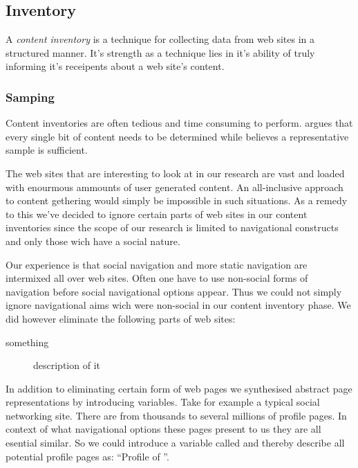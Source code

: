 \subsection{Inventory}

A \emph{content inventory} is a technique for collecting data from web sites
in a structured manner. It's strength as a technique lies in it's ability of
truly informing it's receipents about a web site's content.

\subsubsection{Samping}

Content inventories are often tedious and time consuming to perform.
\citet[p.~267]{wodtke02} argues that every single bit of content needs to be
determined while \citet[p.~241]{morville06} believes a representative sample
is sufficient.

The web sites that are interesting to look at in our research are vast and
loaded with enourmous ammounts of user generated content. An all-inclusive
approach to content gethering would simply be impossible in such situations.
As a remedy to this we've decided to ignore certain parts of web sites in our
content inventories since the scope of our research is limited to navigational
constructs and only those wich have a social nature.

Our experience is that social navigation and more static navigation are
intermixed all over web sites. Often one have to use non-social forms of
navigation before social navigational options appear. Thus we could not simply
ignore navigational aims wich were non-social in our content inventory phase.
We did however eliminate the following parts of web sites:

\begin{description}
  \item[something] description of it
\end{description}

In addition to eliminating certain form of web pages we synthesised abstract
page representations by introducing variables. Take for example a typical
social networking site. There are from thousands to several millions of
profile pages. In context of what navigational options these pages present to
us they are all esential similar. So we could introduce a variable called
%
and thereby describe all potential profile pages as: ``Profile
of ''.

